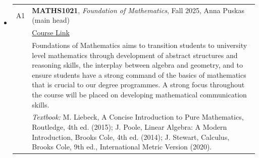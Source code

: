 \documentclass[12pt]{article}
\begin{document}
\begin{itemize}[leftmargin = *]
     \item[]
        \begin{tabularx}{\textwidth}{@{}lX@{}}
            A1 & \textbf{MATHS1021}, \textit{Foundation of Mathematics}, Fall 2025, Anna Puskas (main head)
            \\
            &
            \href{https://www.gla.ac.uk/coursecatalogue/course/?code=MATHS1021}{Course Link} \\
            &
            Foundations of Mathematics aims to transition students to university level mathematics through development of abstract structures and reasoning skills, the interplay between algebra and geometry, and to ensure students have a strong command of the basics of mathematics that is crucial to our degree programmes. A strong focus throughout the course will be placed on developing mathematical communication skills.         \\
            & \textit{Textbook:} 
            M. Liebeck, A Concise Introduction to Pure Mathematics, Routledge, 4th ed. (2015);
            J. Poole, Linear Algebra: A Modern Introduction, Brooks Cole, 4th ed. (2014); 
            J. Stewart, Calculus, Brooks Cole, 9th ed., International Metric Version (2020).

        \end{tabularx}


\end{itemize}
\end{document}

